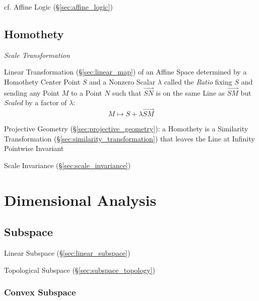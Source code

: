 cf. Affine Logic (\S\ref{sec:affine_logic})



\subsection{Homothety}\label{sec:homothety}

\emph{Scale Transformation}

Linear Transformation (\S\ref{sec:linear_map}) of an Affine Space determined by
a Homothety Center Point $S$ and a Nonzero Scalar $\lambda$ called the
\emph{Ratio} fixing $S$ and sending any Point $M$ to a Point $N$ such that
$\vec{SN}$ is on the same Line as $\vec{SM}$ but \emph{Scaled} by a factor of
$\lambda$:
\[
  M \mapsto S + \lambda\vec{SM}
\]

\fist Projective Geometry (\S\ref{sec:projective_geometry}): a Homothety is a
Similarity Transformation (\S\ref{sec:similarity_transformation}) that leaves
the Line at Infinity Pointwise Invariant

\fist Scale Invariance (\S\ref{sec:scale_invariance})



\section{Dimensional Analysis}\label{sec:dimensional_analysis}

\subsection{Subspace}\label{sec:subspace}


\fist Linear Subspace (\S\ref{sec:linear_subspace})

\fist Topological Subspace (\S\ref{sec:subspace_topology})



\subsubsection{Convex Subspace}\label{sec:convex_subspace}

